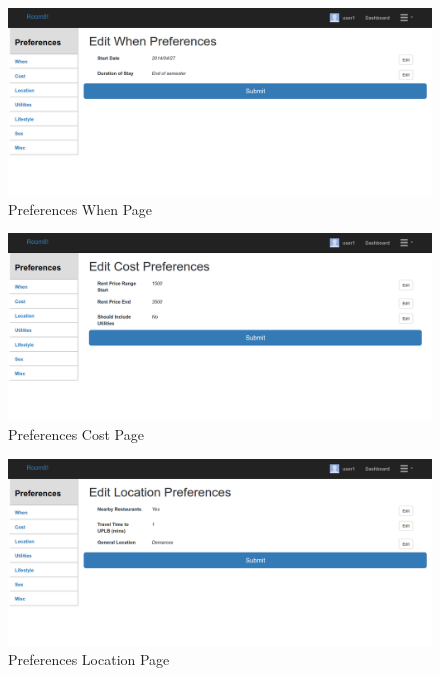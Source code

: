 \documentclass[journal]{IEEEtran}
\begin{document}
    \begin{figure}
        \centering
            \includegraphics[scale=0.17]{prefwhen.png}
            \caption{Preferences When Page}
            \label{Preferences When Page}
    \end{figure}
    \begin{figure}
        \centering
            \includegraphics[scale=0.17]{prefcost.png}
            \caption{Preferences Cost Page}
            \label{Preferences Cost Page}
    \end{figure}
    \begin{figure}
        \centering
            \includegraphics[scale=0.17]{preflocation.png}
            \caption{Preferences Location Page}
            \label{Preferences Location Page}
    \end{figure}
\end{document}
